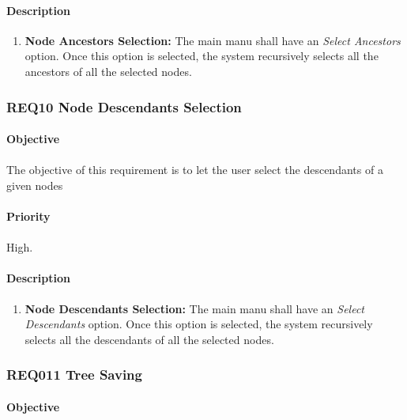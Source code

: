 \documentclass[10pt,a4paper]{article}
\begin{document}
\paragraph{Description}
  \begin{enumerate}
    \item \textbf{Node Ancestors Selection: }
	The main manu shall have an \emph{Select Ancestors} option. Once this option is selected, the system recursively selects all the ancestors of all the selected nodes.
    \end{enumerate}
	
	  \subsubsection{REQ10 Node Descendants Selection}
\paragraph{Objective}
\paragraph{}
The objective of this requirement is to let the user select the descendants of a given nodes

\paragraph{Priority}
\paragraph{}
High.
\paragraph{Description}
  \begin{enumerate}
    \item \textbf{Node Descendants Selection: }
	The main manu shall have an \emph{Select Descendants} option. Once this option is selected, the system recursively selects all the descendants of all the selected nodes.
    \end{enumerate}

\subsubsection{REQ011 Tree Saving}
\paragraph{Objective}
\end{document}
